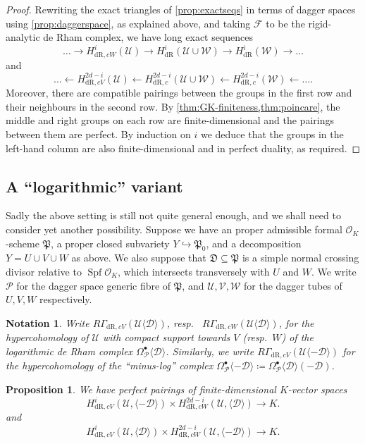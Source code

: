 \documentclass[cjm]{ipart}
\theoremstyle{plain}
\newtheorem{proposition}[theorem]{Proposition}
\newtheorem{notation}[theorem]{Notation}
\theoremstyle{remark}
\newcommand{\cD}{\mathcal{D}}
\newcommand{\cF}{\mathcal{F}}
\newcommand{\cO}{\mathcal{O}}
\newcommand{\cP}{\mathcal{P}}
\newcommand{\cU}{\mathcal{U}}
\newcommand{\cV}{\mathcal{V}}
\newcommand{\cW}{\mathcal{W}}
\newcommand{\dR}{\mathrm{dR}}
\newcommand{\fP}{\mathfrak{P}}
\newcommand{\into}{\hookrightarrow}
\numberwithin{equation}{subsection}
\begin{document}
   \begin{proof}
    Rewriting the exact triangles of \cref{prop:exactseqs} in terms of dagger spaces using \cref{prop:daggerspace}, as explained above, and taking $\cF$ to be the rigid-analytic de Rham complex, we have long exact sequences
    \[ \dots \to H^i_{\dR, cW}(\cU) \to H^i_{\dR}(\cU \cup \cW) \to H^i_{\dR}(\cW) \to \dots\]
    and
    \[\dots \leftarrow H^{2d-i}_{\dR, cV}(\cU) \leftarrow H^{2d-i}_{\dR, c}(\cU \cup \cW) \leftarrow H^{2d-i}_{\dR, c}(\cW) \leftarrow \dots.\]
    Moreover, there are compatible pairings between the groups in the first row and their neighbours in the second row. By \cref{thm:GK-finiteness,thm:poincare}, the middle and right groups on each row are finite-dimensional and the pairings between them are perfect. By induction on $i$ we deduce that the groups in the left-hand column are also finite-dimensional and in perfect duality, as required.
   \end{proof}

  \subsection{A ``logarithmic'' variant}

   Sadly the above setting is still not quite general enough, and we shall need to consider yet another possibility. Suppose we have an proper admissible formal $\cO_K$-scheme $\fP$, a proper closed subvariety $Y \into \fP_0$, and a decomposition $Y = U \cup V \cup W$ as above. We also suppose that $\mathfrak{D} \subseteq \fP$ is a simple normal crossing divisor relative to $\operatorname{Spf} \cO_K$, which intersects transversely with $U$ and $W$. We write $\cP$ for the dagger space generic fibre of $\fP$, and $\cU, \cV, \cW$ for the dagger tubes of $U, V, W$ respectively.

   \begin{notation}\label{not:logdR}
    Write $R\Gamma_{\dR, cV}(\cU\langle \cD \rangle)$, resp.~ $R\Gamma_{\dR, cW}(\cU\langle \cD \rangle)$, for the hypercohomology of $\cU$ with compact support towards $V$ (resp.~$W$) of the \emph{logarithmic} de Rham complex $\Omega^\bullet_{\cP}\langle \cD\rangle$. Similarly, we write $R\Gamma_{\dR, cV}(\cU\langle -\cD \rangle)$ for the hypercohomology of the ``minus-log'' complex $\Omega^\bullet_{\cP}\langle - \cD \rangle \coloneqq \Omega_{\cP}^\bullet\langle \cD\rangle(-\cD)$.
   \end{notation}

   \begin{proposition}
    \label{prop:logpartialpoincare}
    We have perfect pairings of finite-dimensional $K$-vector spaces
    \[ H^i_{\dR, cV}(\cU, \langle -\cD \rangle) \times H^{2d-i}_{\dR, cW}(\cU, \langle \cD \rangle) \to K. \]
    and
    \[ H^i_{\dR, cV}(\cU, \langle \cD \rangle) \times H^{2d-i}_{\dR, cW}(\cU, \langle -\cD \rangle) \to K. \]
   \end{proposition}
\end{document}
